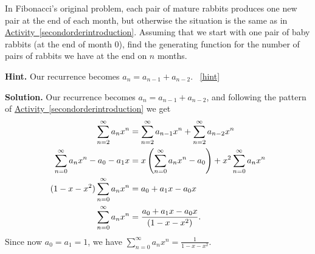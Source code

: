 \documentclass{book}
\begin{document}
\setcounter{project}{261}
\addtocounter{project}{-1}
\begin{activity}[]\label{originalFibonacci}
\hypertarget{p-1363}{}%
In Fibonacci's original problem, each pair of mature rabbits produces one new pair at the end of each month, but otherwise the situation is the same as in \hyperref[secondorderintroduction]{Activity~\ref{secondorderintroduction}}.  Assuming that we start with one pair of baby rabbits (at the end of month 0), find the generating function for the number of pairs of rabbits we have at the end on \(n\) months.%
\par\smallskip%
\noindent\textbf{Hint.}\hypertarget{hint-168}{}\quad%
\hypertarget{p-1364}{}%
Our recurrence becomes \(a_n = a_{n-1} + a_{n-2}\).%
~\hfill{\tiny\hyperlink{a-261}{[hint]}\hypertarget{q-261}{}}\par\smallskip%
\noindent\textbf{Solution.}\hypertarget{solution-163}{}\quad%
\hypertarget{p-1365}{}%
Our recurrence becomes \(a_n=a_{n-1}+a_{n-2}\), and following the pattern of \hyperref[secondorderintroduction]{Activity~\ref{secondorderintroduction}} we get%
\begin{align*}
\sum_{n=2}^\infty a_nx^n &= \sum_{n=2}^\infty a_{n-1}x^n +
\sum_{n=2}^\infty a_{n-2}x^n\\
\sum_{n=0}^\infty a_nx^n-a_0-a_1x  &= x\left(\sum_{n=0}^\infty
a_{n}x^{n}-a_0\right) + x^2\sum_{n=0}^\infty a_{n}x^n\\
(1-x-x^2)\sum_{n=0}^\infty a_nx^n &= a_0+a_1x-a_0x\\
\sum_{n=0}^\infty a_nx^n &= \frac{a_0+a_1x-a_0x}{(1-x-x^2)}\text{.}
\end{align*}
Since now \(a_0=a_1=1\), we have \(\displaystyle \sum_{n=0}^\infty a_nx^n=
\frac{1}{1-x-x^2}\).%
\end{activity}

\clearpage
\end{document}
